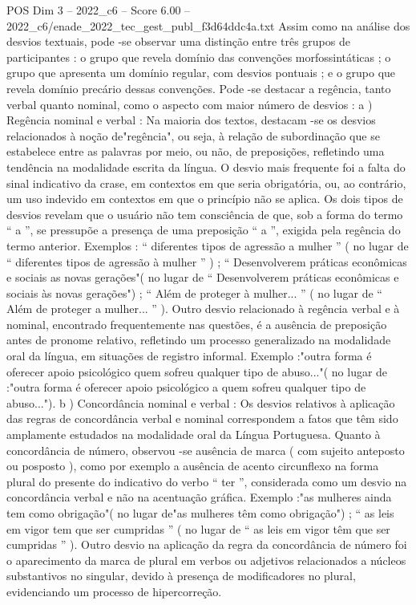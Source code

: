 \begin{textsample}{POS Dim 3 – 2022\_c6 – Score 6.00 – 2022\_c6/enade\_2022\_tec\_gest\_publ\_f3d64ddc4a.txt}
Assim como na análise dos desvios textuais, pode -se observar uma distinção entre três grupos de participantes : o grupo que revela domínio das convenções morfossintáticas ; o grupo que apresenta um domínio regular, com desvios pontuais ; e o grupo que revela domínio precário dessas convenções.
Pode -se destacar a regência, tanto verbal quanto nominal, como o aspecto com maior número de desvios : a ) Regência nominal e verbal : Na maioria dos textos, destacam -se os desvios relacionados à noção de"regência", ou seja, à relação de subordinação que se estabelece entre as palavras por meio, ou não, de preposições, refletindo uma tendência na modalidade escrita da língua.
O desvio mais frequente foi a falta do sinal indicativo da crase, em contextos em que seria obrigatória, ou, ao contrário, um uso indevido em contextos em que o princípio não se aplica.
Os dois tipos de desvios revelam que o usuário não tem consciência de que, sob a forma do termo “ a ”, se pressupõe a presença de uma preposição “ a ”, exigida pela regência do termo anterior.
Exemplos : “ diferentes tipos de agressão a mulher ” ( no lugar de “ diferentes tipos de agressão à mulher ” ) ; “ Desenvolverem práticas econômicas e sociais as novas gerações"( no lugar de “ Desenvolverem práticas econômicas e sociais às novas gerações") ; “ Além de proteger à mulher... ” ( no lugar de “ Além de proteger a mulher... ” ).
Outro desvio relacionado à regência verbal e à nominal, encontrado frequentemente nas questões, é a ausência de preposição antes de pronome relativo, refletindo um processo generalizado na modalidade oral da língua, em situações de registro informal.
Exemplo :"outra forma é oferecer apoio psicológico quem sofreu qualquer tipo de abuso..."( no lugar de :"outra forma é oferecer apoio psicológico a quem sofreu qualquer tipo de abuso..."). b ) Concordância nominal e verbal : Os desvios relativos à aplicação das regras de concordância verbal e nominal correspondem a fatos que têm sido amplamente estudados na modalidade oral da Língua Portuguesa.
Quanto à concordância de número, observou -se ausência de marca ( com sujeito anteposto ou posposto ), como por exemplo a ausência de acento circunflexo na forma plural do presente do indicativo do verbo “ ter ”, considerada como um desvio na concordância verbal e não na acentuação gráfica.
Exemplo :"as mulheres ainda tem como obrigação"( no lugar de"as mulheres têm como obrigação") ; “ as leis em vigor tem que ser cumpridas ” ( no lugar de “ as leis em vigor têm que ser cumpridas ” ).
Outro desvio na aplicação da regra da concordância de número foi o aparecimento da marca de plural em verbos ou adjetivos relacionados a núcleos substantivos no singular, devido à presença de modificadores no plural, evidenciando um processo de hipercorreção.

\end{textsample}
